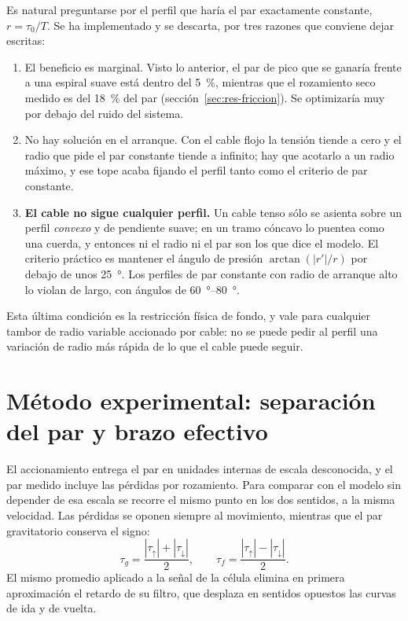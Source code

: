 Es natural preguntarse por el perfil que haría el par exactamente constante, $r = \tau_0/T$. Se ha
implementado y se descarta, por tres razones que conviene dejar escritas:

\begin{enumerate}
  \item El beneficio es marginal. Visto lo anterior, el par de pico que se ganaría frente a una
        espiral suave está dentro del \SI{5}{\percent}, mientras que el rozamiento seco medido es del
        \SI{18}{\percent} del par (sección~\ref{sec:res-friccion}). Se optimizaría muy por debajo del
        ruido del sistema.
  \item No hay solución en el arranque. Con el cable flojo la tensión tiende a cero y el radio que
        pide el par constante tiende a infinito; hay que acotarlo a un radio máximo, y ese tope
        acaba fijando el perfil tanto como el criterio de par constante.
  \item \textbf{El cable no sigue cualquier perfil.} Un cable tenso sólo se asienta sobre un perfil
        \emph{convexo} y de pendiente suave; en un tramo cóncavo lo puentea como una cuerda, y
        entonces ni el radio ni el par son los que dice el modelo. El criterio práctico es mantener
        el ángulo de presión $\arctan(|r'|/r)$ por debajo de unos \SI{25}{\degree}. Los perfiles de
        par constante con radio de arranque alto lo violan de largo, con ángulos de
        \SIrange{60}{80}{\degree}.
\end{enumerate}

Esta última condición es la restricción física de fondo, y vale para cualquier tambor de radio
variable accionado por cable: no se puede pedir al perfil una variación de radio más rápida de lo
que el cable puede seguir.

\section{Método experimental: separación del par y brazo efectivo}
\label{sec:mod-separacion}

El accionamiento entrega el par en unidades internas de escala desconocida, y el par medido incluye
las pérdidas por rozamiento. Para comparar con el modelo sin depender de esa escala se recorre el
mismo punto en los dos sentidos, a la misma velocidad. Las pérdidas se oponen siempre al movimiento,
mientras que el par gravitatorio conserva el signo:
\begin{equation}
  \tau_g = \frac{|\tau_{\uparrow}| + |\tau_{\downarrow}|}{2}, \qquad
  \tau_f = \frac{|\tau_{\uparrow}| - |\tau_{\downarrow}|}{2}.
  \label{eq:separacion}
\end{equation}
El mismo promedio aplicado a la señal de la célula elimina en primera aproximación el retardo de su
filtro, que desplaza en sentidos opuestos las curvas de ida y de vuelta.


